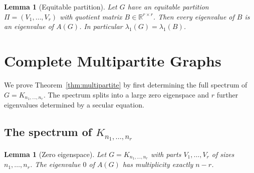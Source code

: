 \documentclass[preprint,12pt]{elsarticle}
\theoremstyle{plain}
\newtheorem{lemma}[theorem]{Lemma}
\theoremstyle{definition}
\newcommand{\R}{\mathbb{R}}
\begin{document}
\begin{lemma}[Equitable partition]
  \label{lem:equitable}
  Let $G$ have an equitable partition $\Pi = (V_1,\ldots,V_r)$ with quotient
  matrix $B \in \R^{r\times r}$.
  Then every eigenvalue of $B$ is an eigenvalue of $A(G)$.
  In particular $\lambda_1(G) = \lambda_1(B)$.
\end{lemma}

\section{Complete Multipartite Graphs}
\label{sec:multipartite}

We prove Theorem~\ref{thm:multipartite} by first determining the full
spectrum of $G = K_{n_1,\ldots,n_r}$.
The spectrum splits into a large zero eigenspace and $r$ further
eigenvalues determined by a secular equation.

\subsection{The spectrum of $K_{n_1,\ldots,n_r}$}

\begin{lemma}[Zero eigenspace]
  \label{lem:within}
  Let $G = K_{n_1,\ldots,n_r}$ with parts $V_1,\ldots,V_r$ of sizes
  $n_1,\ldots,n_r$.  The eigenvalue $0$ of $A(G)$ has multiplicity
  exactly $n - r$.
\end{lemma}
\end{document}
